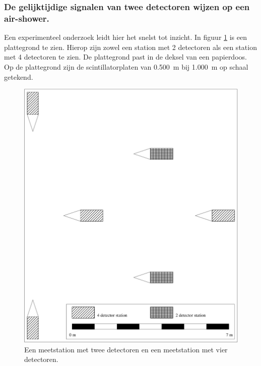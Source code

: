 \bigskip{}



\subsubsection{De gelijktijdige signalen van twee detectoren wijzen op een air-shower.}

Een experimenteel onderzoek leidt hier het snelst tot inzicht. In
figuur \ref{fig:Meetstations} is een plattegrond te zien. Hierop
zijn zowel een station met 2 detectoren als een station met 4 detectoren
te zien. De plattegrond past in de deksel van een papierdoos. Op de
plattegrond zijn de scintillatorplaten van \SI{0.500}{\meter} bij
\SI{1.000}{\meter} op schaal getekend. 

\noindent \begin{center}
\begin{figure}[p]
\noindent \begin{centering}
\includegraphics[width=15.833cm]{Figures/station}
\par\end{centering}

\caption{\label{fig:Meetstations}Een meetstation met twee detectoren en een
meetstation met vier detectoren.}
\end{figure}

\par\end{center}

